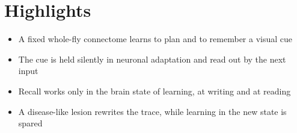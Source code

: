 \section{Highlights}
\begin{itemize}
  \item A fixed whole-fly connectome learns to plan and to remember a visual cue
  \item The cue is held silently in neuronal adaptation and read out by the next input
  \item Recall works only in the brain state of learning, at writing and at reading
  \item A disease-like lesion rewrites the trace, while learning in the new state is spared
\end{itemize}

